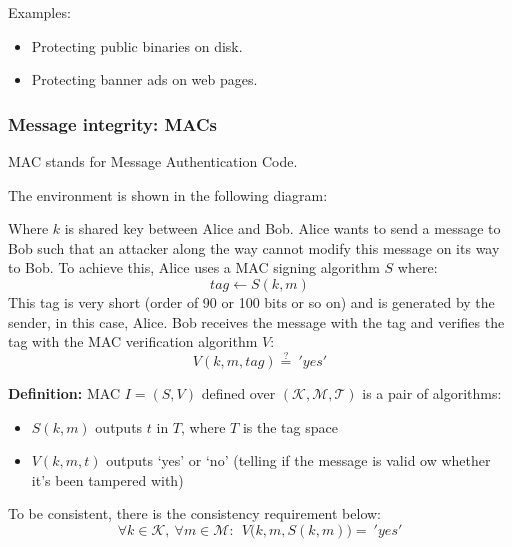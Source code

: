 \documentclass[12pt]{book}
\newcommand{\Def}{\textcolor{dkgreen}{\textbf{Definition:}} }
\begin{document}
Examples:
\begin{itemize}
	\item Protecting public binaries on disk.
	\item Protecting banner ads on web pages.
\end{itemize}

\subsubsection{Message integrity: MACs}
MAC stands for Message Authentication Code.

The environment is shown in the following diagram:
\begin{center}
\end{center}Where $k$ is shared key between Alice and Bob. Alice wants to send a message to Bob such that an attacker along the way cannot modify this message on its way to Bob. To achieve this, Alice uses a MAC signing algorithm $S$ where:
$$tag\leftarrow S(k,m)$$This tag is very short (order of 90 or 100 bits or so on) and is generated by the sender, in this case, Alice. Bob receives the message with the tag and verifies the tag with the MAC verification algorithm $V$:
$$V(k,m,tag)\stackrel{?}{=}\ 'yes'$$

\Def MAC $I=(S,V)$ defined over $(\mathcal{K,M,T})$ is a pair of algorithms:
\begin{itemize}
	\item $S(k,m)$ outputs $t$ in $T$, where $T$ is the tag space
	\item $V(k,m,t)$ outputs `yes' or `no' (telling if the message is valid ow whether it's been tampered with)
\end{itemize}
To be consistent, there is the consistency requirement below:
$$\forall k\in\mathcal{K},\ \forall m\in\mathcal{M}:\ \ V\big(k,m,S(k,m)\big)=\ 'yes'$$
\end{document}
